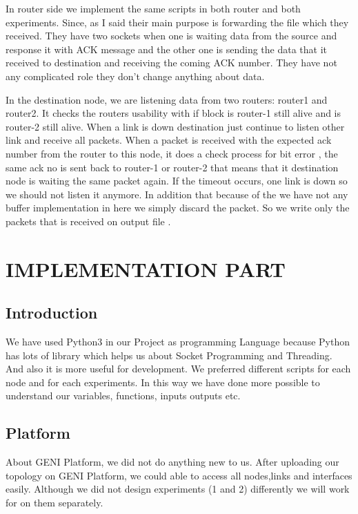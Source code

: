 \documentclass[letterpaper, 12 pt, conference]{ieeeconf}  %
\begin{document}
In router side we implement the same scripts in both router and both experiments. Since, as I said their main purpose is forwarding the file which they received. They have two sockets when one is waiting data from the source and response it with ACK message and the other one is sending the data that it received to destination and receiving the coming ACK number. They have not any complicated role they don’t change anything about data.
\vspace{1cm}

In the destination node, we are listening data from two routers: router1 and router2. It checks the routers usability with if block is router-1 still alive and is router-2 still alive. When a link is down destination just continue to listen other link and receive all packets. When a packet is received with the expected ack number from the router to this node, it does a check process for bit error , the same ack no is sent back to router-1 or router-2 that means that it destination node is waiting the same packet again. If the timeout occurs, one link is down so we should not listen it anymore. In addition that because of the we have not any buffer implementation in here we simply discard the packet. So we write only the packets that is received on output file .
\vspace{1cm}	

\section{IMPLEMENTATION PART}

\subsection{Introduction}

We have used Python3 in our Project as programming Language because  Python has lots of library which helps us about Socket Programming and Threading. And also it is more useful  for development.  We preferred different scripts for each node and for each experiments. In this way we have done more possible  to understand our variables, functions,  inputs outputs etc.
\vspace{1cm}

\subsection{Platform}
About GENI Platform, we did not do anything new to us.  After uploading our topology on GENI Platform, we could able to access all nodes,links and interfaces easily. Although we did not design experiments (1 and 2) differently we will work for on them separately.
\vspace{1cm}
\end{document}
